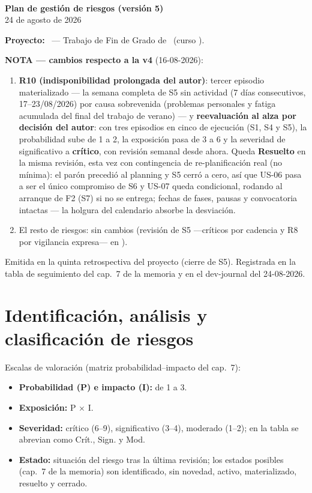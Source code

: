 \documentclass[11pt,a4paper]{article}
\begin{document}
\begin{center}
  {\Huge\bfseries\bukit}\\[0.5cm]
  {\Large\bfseries Plan de gestión de riesgos (versión 5)}\\[0.4cm]
  {\large 24 de agosto de 2026}
\end{center}
\vspace{0.6cm}

\textbf{Proyecto:} \thesisTitle\ — Trabajo de Fin de Grado de \thesisAuthor\ (curso \thesisCourse).

\textbf{NOTA — cambios respecto a la v4} (16-08-2026):
\begin{enumerate}
  \item \textbf{R10 (indisponibilidad prolongada del autor)}: tercer episodio materializado — la semana completa de S5 sin actividad (7 días consecutivos, 17--23/08/2026) por causa sobrevenida (problemas personales y fatiga acumulada del final del trabajo de verano) — y \textbf{reevaluación al alza por decisión del autor}: con tres episodios en cinco  de ejecución (S1, S4 y S5), la probabilidad sube de 1 a 2, la exposición pasa de 3 a 6 y la severidad de significativo a \textbf{crítico}, con revisión semanal desde ahora.
  Queda \textbf{Resuelto} en la misma revisión, esta vez con contingencia de re-planificación real (no mínima): el parón precedió al planning y S5 cerró a cero, así que US-06 pasa a ser el único compromiso de S6 y US-07 queda condicional, rodando al arranque de F2 (S7) si no se entrega; fechas de fases, pausas y convocatoria intactas — la holgura del calendario absorbe la desviación.
  \item El resto de riesgos: sin cambios (revisión de S5 —críticos por cadencia y R8 por vigilancia expresa— en ).
\end{enumerate}

Emitida en la quinta retrospectiva del proyecto (cierre de S5).
Registrada en la tabla de seguimiento del cap.~7 de la memoria y en el dev-journal del 24-08-2026.

\section{Identificación, análisis y clasificación de riesgos}

Escalas de valoración (matriz probabilidad--impacto del cap.~7):
\begin{itemize}
  \item \textbf{Probabilidad (P) e impacto (I):} de 1 a 3.
  \item \textbf{Exposición:} P \(\times\) I.
  \item \textbf{Severidad:} crítico (6–9), significativo (3–4), moderado (1–2); en la tabla se abrevian como Crít., Sign. y Mod.
  \item \textbf{Estado:} situación del riesgo tras la última revisión; los estados posibles (cap.~7 de la memoria) son identificado, sin novedad, activo, materializado, resuelto y cerrado.
\end{itemize}
\end{document}
